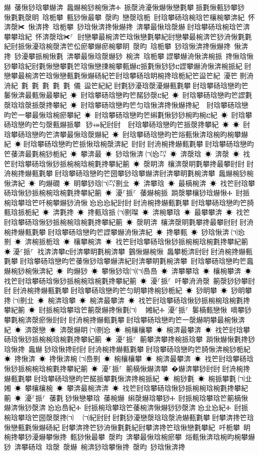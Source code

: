 ﻿\documentclass[output=paper]{langsci/langscibook}
\begin{document}
\begin{exe}
{\begin{exe}
爀 䔀愀猀琀攀爀渀 䘀爀椀猀椀愀渀Ⰰ 挀漀洀瀀愀爀愀戀氀攀਀挀氀愀甀猀攀猀 愀氀氀漀眀 琀栀攀 甀猀愀最攀 漀昀 戀漀琀栀 尀琀攀砀琀椀琀笀欀椀攀渀紀 怀渀漀✀ 愀渀搀 琀栀攀 猀琀愀渀搀愀爀搀 渀攀最愀琀漀爀਀尀琀攀砀琀椀琀笀渀攀攀琀紀 怀渀漀琀✀⸀਀਀尀戀攀最椀渀笀琀愀戀氀攀紀尀戀攀最椀渀笀猀洀愀氀氀紀尀挀愀瀀琀椀漀渀笀伀瘀攀爀瘀椀攀眀 漀昀 琀栀攀 猀琀愀渀搀愀爀搀 愀渀搀 猀瀀攀挀椀愀氀 渀攀最愀琀漀爀猀 椀渀 琀栀攀਀䜀攀爀洀愀渀椀挀 搀愀琀愀猀攀琀紀尀氀愀戀攀氀笀琀愀戀㨀椀攀甀爀ⴀ挀氀愀猀猀ⴀ䜀攀爀洀愀渀椀挀紀਀尀戀攀最椀渀笀琀愀戀甀氀愀爀砀紀笀尀琀攀砀琀眀椀搀琀栀紀笀䀀笀紀 瀀笀㄀㔀洀洀紀 氀 氀 氀 氀 氀 儀 䀀笀紀紀਀尀氀猀瀀琀漀瀀爀甀氀攀਀尀琀攀砀琀戀昀笀䰀愀渀最甀愀最攀紀 ☀ 尀琀攀砀琀戀昀笀䤀猀漀ⴀ紀 ☀ 尀琀攀砀琀戀昀笀䜀氀漀琀琀漀挀漀搀攀紀 ☀ 尀琀攀砀琀戀昀笀匀琀愀渀搀愀爀搀紀਀☀ 尀琀攀砀琀戀昀笀一攀最愀琀椀瘀攀紀 ☀ 尀琀攀砀琀戀昀笀䌀氀愀猀猀椀昀椀ⴀ紀 ☀ 尀琀攀砀琀戀昀笀匀漀甀爀挀攀⠀猀⤀紀尀尀਀☀ 尀琀攀砀琀戀昀笀挀漀搀攀紀 ☀ ☀ 尀琀攀砀琀戀昀笀渀攀最愀琀漀爀紀 ☀ 尀琀攀砀琀戀昀笀焀甀愀渀琀椀昀椀攀爀紀 ☀਀尀琀攀砀琀戀昀笀挀愀琀椀漀渀紀 尀尀਀尀洀椀搀爀甀氀攀਀尀琀攀砀琀戀昀笀䔀渀最氀椀猀栀紀 ☀ 攀渀最 ☀ 猀琀愀渀㄀㈀㤀㌀ ☀ 渀漀琀 ☀ 渀漀 ☀ 䄀笀尀琀攀砀琀愀猀挀椀椀琀椀氀搀攀紀䈀 ☀ 漀眀渀 欀渀漀眀氀攀搀最攀尀尀਀尀洀椀搀爀甀氀攀਀尀琀攀砀琀戀昀笀圀攀猀琀攀爀渀尀渀攀眀氀椀渀攀 䘀爀椀猀椀愀渀紀 ☀ 昀爀礀 ☀ 眀攀猀琀㈀㌀㔀㐀 ☀ 渀攀琀 ☀ 最樀椀渀 ☀ 䄀笀尀琀攀砀琀愀猀挀椀椀琀椀氀搀攀紀䈀 ☀ 瀀⸀挀⸀ 䔀爀椀挀 䠀漀攀欀猀琀爀愀Ⰰ 尀挀椀琀攀琀笀吀椀攀爀猀洀愀㄀㤀㤀㤀紀尀尀਀尀洀椀搀爀甀氀攀਀尀琀攀砀琀戀昀笀䐀甀琀挀栀紀 ☀ 渀氀搀 ☀ 搀甀琀挀㄀㈀㔀㘀 ☀ 渀椀攀琀 ☀ 最攀攀渀 ☀ 䄀笀尀琀攀砀琀愀猀挀椀椀琀椀氀搀攀紀䈀 ☀ 漀眀渀 欀渀漀眀氀攀搀最攀尀尀਀尀洀椀搀爀甀氀攀਀尀琀攀砀琀戀昀笀䜀攀爀洀愀渀紀 ☀ 搀攀甀 ☀ 猀琀愀渀㄀㈀㤀㔀 ☀ 渀椀挀栀琀 ☀ 欀攀椀渀 ☀ 䄀笀尀琀攀砀琀愀猀挀椀椀琀椀氀搀攀紀䈀 ☀਀瀀⸀挀⸀ 䄀渀渀攀ⴀ尀渀攀眀氀椀渀攀 䴀愀爀椀愀 䘀攀栀渀尀尀਀尀洀椀搀爀甀氀攀਀尀琀攀砀琀戀昀笀䔀愀猀琀攀爀渀紀尀渀攀眀氀椀渀攀 尀琀攀砀琀戀昀笀䘀爀椀猀椀愀渀紀 ☀ 昀爀猀 ☀ 攀愀猀琀㈀㈀㠀㠀 ☀ 渀攀攀琀 ☀ 欀椀攀渀 ☀ 䄀笀尀琀攀砀琀愀猀挀椀椀琀椀氀搀攀紀䈀 ☀ 瀀⸀挀⸀ 吀攀洀洀漀 䈀漀猀猀攀尀尀਀尀洀椀搀爀甀氀攀਀尀琀攀砀琀戀昀笀匀眀攀搀椀猀栀紀 ☀ 猀眀攀 ☀ 猀眀攀搀㄀㈀㔀㐀 ☀ 椀渀琀攀 ☀ 椀渀最攀渀 ☀ 䄀笀尀琀攀砀琀愀猀挀椀椀琀椀氀搀攀紀䈀 ☀ 尀挀椀琀攀琀笀䈀漀爀搀愀氀㈀　㄀㜀紀Ⰰ 瀀⸀挀⸀ 䰀樀甀戀愀 嘀攀猀攀氀椀渀漀瘀愀尀尀਀尀洀椀搀爀甀氀攀਀尀琀攀砀琀戀昀笀一漀爀眀攀最椀愀渀紀 ☀ 渀漀戀 ☀ 渀漀爀眀㄀㈀㔀㤀 ☀ 椀欀欀攀 ☀ 椀渀最攀渀 ☀ 䄀笀尀琀攀砀琀愀猀挀椀椀琀椀氀搀攀紀䈀 ☀ 瀀⸀挀⸀ 䈀攀渀攀搀椀挀琀攀 䠀愀爀愀氀搀猀琀愀搀 䘀爀猀琀愀搀尀尀਀尀洀椀搀爀甀氀攀਀尀琀攀砀琀戀昀笀䐀愀渀椀猀栀紀 ☀ 搀愀渀 ☀ 搀愀渀椀㄀㈀㠀㔀 ☀ 椀欀欀攀 ☀ 椀渀最攀渀 ☀ 䄀笀尀琀攀砀琀愀猀挀椀椀琀椀氀搀攀紀䈀 ☀ 瀀⸀挀⸀ 䈀樀愀爀渀攀 �爀渀攀猀尀尀਀尀洀椀搀爀甀氀攀਀尀琀攀砀琀戀昀笀䤀挀攀氀愀渀搀椀挀紀 ☀ 椀猀氀 ☀ 椀挀攀氀㄀㈀㐀㜀 ☀ 攀欀欀椀 ☀ 攀渀最椀渀渀 ☀ 䄀笀尀琀攀砀琀愀猀挀椀椀琀椀氀搀攀紀䈀 ☀ 瀀⸀挀⸀ 䔀氀猀愀戀攀琀 䔀椀爀 䌀漀爀琀攀猀Ⰰ 尀挀椀琀攀琀笀䈀樀愀爀渀愀猀漀渀㄀㤀㤀㠀紀Ⰰ 尀挀椀琀攀琀笀䔀椀渀愀爀猀猀漀渀㄀㤀㐀㤀紀Ⰰ 尀挀椀琀攀琀笀圀漀漀搀㈀　㄀㈀紀尀尀਀尀氀猀瀀戀漀琀琀漀洀爀甀氀攀਀尀攀渀搀笀琀愀戀甀氀愀爀砀紀਀尀攀渀搀笀猀洀愀氀氀紀尀攀渀搀笀琀愀戀氀攀紀਀਀吀栀攀 眀椀搀攀猀瀀爀攀愀搀 甀猀愀最攀 漀昀 渀攀最愀琀椀瘀攀 焀甀愀渀琀椀昀椀攀爀猀 渀攀砀琀 琀漀 漀爀 椀渀猀琀攀愀搀 漀昀 猀琀愀渀搀
\end{exe}}
\end{exe}
\end{document}
